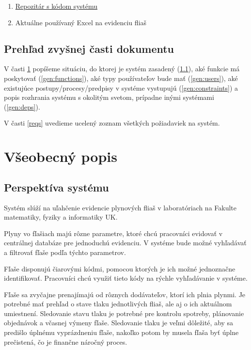\documentclass{zah}
\begin{document}
\begin{enumerate}
	\item \href{https://github.com/TIS2023-FMFI/evidencia-flias}{Repozitár s kódom systému}
	\item Aktuálne používaný Excel na evidenciu fliaš
\end{enumerate}

\subsection{Prehľad zvyšnej časti dokumentu}

V časti \ref{general} popíšeme situáciu, do ktorej je systém zasadený (\ref{gen:perspective}), aké funkcie má poskytovať (\ref{gen:functions}), aké typy používateľov bude mať (\ref{gen:users}), aké existujúce postupy/procesy/predpisy v systéme vystupujú (\ref{gen:constraints}) a popis rozhrania systému s okolitým svetom, prípadne inými systémami (\ref{gen:deps}).

V časti \ref{reqs} uvedieme ucelený zoznam všetkých požiadaviek na systém.

\cleardoublepage
\section{Všeobecný popis}
\label{general}

\subsection{Perspektíva systému}
\label{gen:perspective}
Systém slúží na uľahčenie evidencie plynových fliaš v laboratóriach na Fakulte matematiky, fyziky a informatiky UK.

Plyny vo fľašiach majú rôzne parametre, ktoré chcú pracovníci evidovať v centrálnej databáze pre jednoduchú evidenciu.
V systéme bude možné vyhľadávať a filtrovať fľaše podľa týchto parametrov.

Fľaše disponujú čiarovými kódmi, pomocou ktorých je ich možné jednoznačne identifikovať. Pracovníci chcú využiť tieto kódy na rýchle vyhľadávanie v systéme.

Fľaše sa zvyčajne prenajímajú od rôznych dodávateľov, ktorí ich plnia plynmi. Je potrebné mať prehľad o stave tlaku jednotlivých fliaš, ale aj o ich aktuálnom umiestnení. Sledovanie stavu tlaku je potrebné pre kontrolu spotreby, plánovanie objednávok a včasnej výmeny fľaše. Sledovanie tlaku je veľmi dôležité, aby sa predišlo úplnému vyprázdneniu fľaše, nakoľko potom by musela fľaša byť úplne prečistená, čo je finančne náročný proces.
\end{document}
